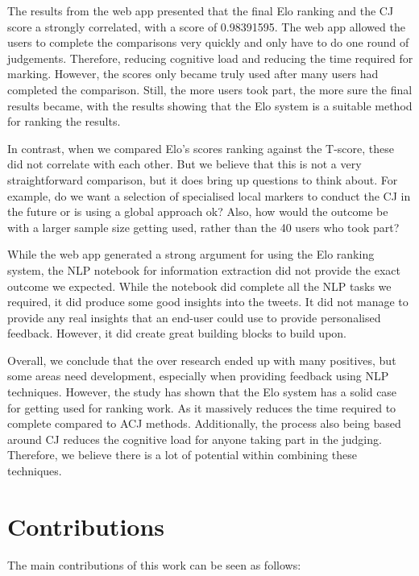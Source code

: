 The results from the web app presented that the final Elo ranking and the CJ score a strongly correlated, with a score of 0.98391595. The web app allowed the users to complete the comparisons very quickly and only have to do one round of judgements. Therefore, reducing cognitive load and reducing the time required for marking. However, the scores only became truly used after many users had completed the comparison. Still, the more users took part, the more sure the final results became, with the results showing that the Elo system is a suitable method for ranking the results.

In contrast, when we compared Elo's scores ranking against the T-score, these did not correlate with each other. But we believe that this is not a very straightforward comparison, but it does bring up questions to think about. For example, do we want a selection of specialised local markers to conduct the CJ in the future or is using a global approach ok? Also, how would the outcome be with a larger sample size getting used, rather than the 40 users who took part?

While the web app generated a strong argument for using the Elo ranking system, the NLP notebook for information extraction did not provide the exact outcome we expected. While the notebook did complete all the NLP tasks we required, it did produce some good insights into the tweets. It did not manage to provide any real insights that an end-user could use to provide personalised feedback. However, it did create great building blocks to build upon.

Overall, we conclude that the over research ended up with many positives, but some areas need development, especially when providing feedback using NLP techniques. However, the study has shown that the Elo system has a solid case for getting used for ranking work. As it massively reduces the time required to complete compared to ACJ methods. Additionally, the process also being based around CJ reduces the cognitive load for anyone taking part in the judging. Therefore, we believe there is a lot of potential within combining these techniques.

\section{Contributions} 
	\label{sec:conclusion_cont}
	
	The main contributions of this work can be seen as follows:
	
